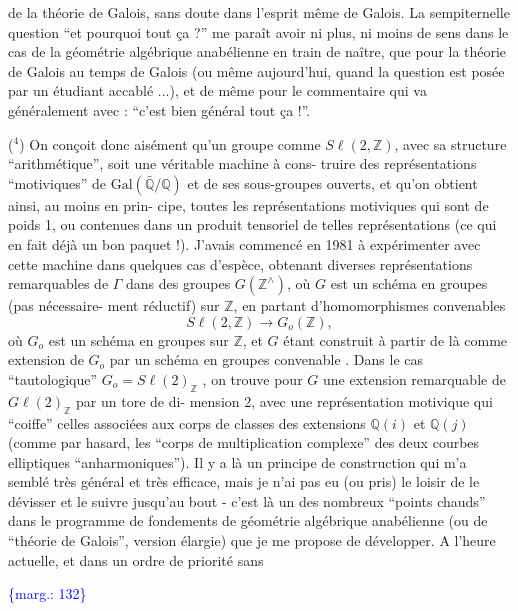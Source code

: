 \documentclass[11pt]{article}
\newcommand{\scanpage}[1]{\par\bigskip\noindent{\small\sffamily[scan #1]}\par}
\newcommand{\mspage}[1]{{\small\sffamily[p.\,#1]}}
\newcommand{\margin}[1]{\textcolor{blue}{\{\textsf{marg.:} #1\}}}
\begin{document}
de la théorie de Galois, sans doute dans l'esprit même de Galois.
La sempiternelle question ``et pourquoi tout ça ?'' me paraît avoir
ni plus, ni moins de sens dans le cas de la géométrie algébrique
anabélienne en train de naître, que pour la théorie de Galois au
temps de Galois (ou même aujourd'hui, quand la question est posée
par un étudiant accablé ...), et de même pour le commentaire qui
va généralement avec : ``c'est bien général tout ça !''.

($^4$) On conçoit donc aisément qu'un groupe comme $S\ell(2,\mathbb{Z})$, avec
sa structure ``arithmétique'', soit une véritable machine à cons-%
truire des représentations ``motiviques'' de $\mathrm{Gal}(\bar{\mathbb{Q}}/\mathbb{Q})$ et de ses
sous-groupes ouverts, et qu'on obtient ainsi, au moins en prin-%
cipe, toutes les représentations motiviques qui sont de poids 1,
ou contenues dans un produit tensoriel de telles représentations
(ce qui en fait déjà un bon paquet !). J'avais commencé en 1981
à expérimenter avec cette machine dans quelques cas d'espèce,
obtenant diverses représentations remarquables de $\Gamma$ dans des
groupes $G(\mathbb{Z}^{\wedge})$, où $G$ est un schéma en groupes (pas nécessaire-%
ment réductif) sur $\mathbb{Z}$, en partant d'homomorphismes convenables
\[ S\ell(2,\mathbb{Z}) \longrightarrow G_o(\mathbb{Z}) , \]
où $G_o$ est un schéma en groupes sur $\mathbb{Z}$, et $G$ étant construit
à partir de là comme extension de $G_o$ par un schéma en groupes
convenable . Dans le cas ``tautologique'' $G_o = S\ell(2)_{\mathbb{Z}}$ , on trouve
pour $G$ une extension remarquable de $G\ell(2)_{\mathbb{Z}}$ par un tore de di-%
mension 2, avec une représentation motivique qui ``coiffe'' celles
associées aux corps de classes des extensions $\mathbb{Q}(i)$ et $\mathbb{Q}(j)$
(comme par hasard, les ``corps de multiplication complexe'' des deux
courbes elliptiques ``anharmoniques''). Il y a là un principe de
construction qui m'a semblé très général et très efficace, mais
je n'ai pas eu (ou pris) le loisir de le dévisser et le suivre
jusqu'au bout - c'est là un des nombreux ``points chauds'' dans le
programme de fondements de géométrie algébrique anabélienne (ou
de ``théorie de Galois'', version élargie) que je me propose de
développer. A l'heure actuelle, et dans un ordre de priorité sans

\margin{132}

\clearpage
\scanpage{119/133}
\mspage{55}
\end{document}
